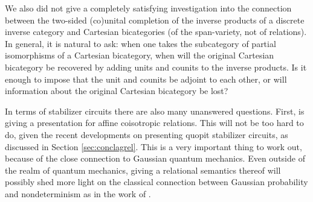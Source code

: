 %

We also did not give a completely satisfying investigation into the connection between the two-sided (co)unital completion of the inverse products of a discrete inverse category and Cartesian bicategories (of the span-variety, not of relations).  In general, it is natural to ask: when one takes the subcategory of partial isomorphisms of a Cartesian bicategory, when will the original Cartesian bicategory be recovered by adding units and counits to the inverse products.  Is it enough to impose that the unit and counits be adjoint to each other, or will information about the original Cartesian bicategory be lost?


In terms of stabilizer circuits there are also many unanswered questions.  First, is giving a presentation for affine coisotropic relations.  This will not be too hard to do, given the recent developments on presenting quopit stabilizer circuits, as discussed in Section \ref{sec:conclagrel}.  This is a very important thing to work out, because of the close connection to Gaussian quantum mechanics.   Even outside of the realm of quantum mechanics, giving  a relational semantics thereof will possibly shed more light on the classical connection between Gaussian probability and nondeterminism as in the work of \cite{stein}.


